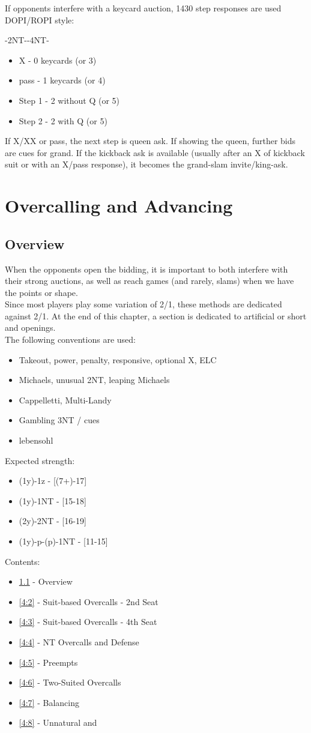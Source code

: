\documentclass[12pt]{report}
\newcommand{\n}{\\}
\newcommand{\q}[1]{\multido{}{#1}{\qquad}}
\newcommand{\ul}[1]{\begin{itemize}#1\end{itemize}}
\newcommand{\li}[1]{\item[~] \q{#1}}
\begin{document}
    If opponents interfere with a keycard auction, 1430 step responses are used DOPI/ROPI style:

    -2NT--4NT-
    \ul{
        \li0 X - 0 keycards (or 3)
        \li0 pass - 1 keycards (or 4)
        \li0 Step 1 - 2 without Q (or 5)
        \li0 Step 2 - 2 with Q (or 5)
    }

    If X/XX or pass, the next step is queen ask.  If showing the queen, further bids are cues for grand.  If the kickback ask is available (usually after an X of kickback suit or with an X/pass response), it becomes the grand-slam invite/king-ask.
\chapter{Overcalling and Advancing} \label{4}
\section{Overview} \label{4:1}
    
    When the opponents open the bidding, it is important to both interfere with their strong auctions, as well as reach games (and rarely, slams) when we have the points or shape.\n

    Since most players play some variation of 2/1, these methods are dedicated against 2/1.  At the end of this chapter, a section is dedicated to artificial or short  and  openings. \n

    The following conventions are used:
    \begin{itemize} \itemsep0em
        \item Takeout, power, penalty, responsive, optional X, ELC
        \item Michaels, unusual 2NT, leaping Michaels
        \item Cappelletti, Multi-Landy
        \item Gambling 3NT / cues
        \item lebensohl\n
    \end{itemize}

    Expected strength:
    \begin{itemize} \itemsep0em
        \li0 (1y)-1z - [(7+)-17]
        \li0 (1y)-1NT - [15-18]
        \li0 (2y)-2NT - [16-19]
        \li0 (1y)-p-(p)-1NT - [11-15] \n
    \end{itemize}

    Contents:
    \ul{
        \li0 \ref{4:1} - Overview
        \li0 \ref{4:2} - Suit-based Overcalls - 2nd Seat
        \li0 \ref{4:3} - Suit-based Overcalls - 4th Seat
        \li0 \ref{4:4} - NT Overcalls and Defense
        \li0 \ref{4:5} - Preempts
        \li0 \ref{4:6} - Two-Suited Overcalls
        \li0 \ref{4:7} - Balancing
        \li0 \ref{4:8} - Unnatural \cl1 and \di1 \newpage
    }
\end{document}
